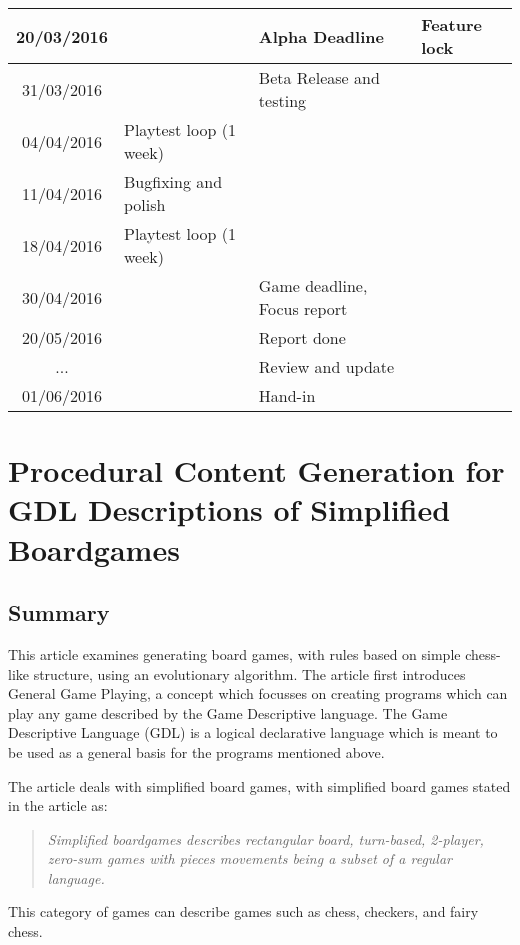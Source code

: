\documentclass[a4paper,11pt]{article}
\begin{document}
\begin{tabular}{|c|l|l|l|}
\hline
20/03/2016 &  & Alpha Deadline & Feature lock\\
\hline
31/03/2016 &  & Beta Release and testing & \\
\hline
04/04/2016 & Playtest loop (1 week) &  & \\
\hline
11/04/2016 & Bugfixing and polish &  & \\
\hline
18/04/2016 & Playtest loop (1 week) &  & \\
\hline
30/04/2016 &  & Game deadline, Focus report &\\
\hline
20/05/2016 &  & Report done & \\
\hline
... &  & Review and update & \\
\hline
01/06/2016 &  & Hand-in & \\
\hline
\end{tabular}


\pagebreak

\section{Procedural Content Generation for GDL Descriptions of Simplified Boardgames}
\subsection{Summary}
This article\cite{simpboard} examines generating board games, with rules based on simple chess-like structure, using an evolutionary algorithm.
The article first introduces General Game Playing, a concept which focusses on creating programs which can play any game described by the Game Descriptive language.
The Game Descriptive Language (GDL) is a logical declarative language which is meant to be used as a general basis for the programs mentioned above.

The article deals with simplified board games, with simplified board games stated in the article\cite{simpboard} as:
\begin{quote}
\textit{Simplified boardgames describes rectangular board, turn-based, 2-player, zero-sum games with pieces movements being a subset of a regular language.}
\end{quote}
This category of games can describe games such as chess, checkers, and fairy chess. 
\end{document}
